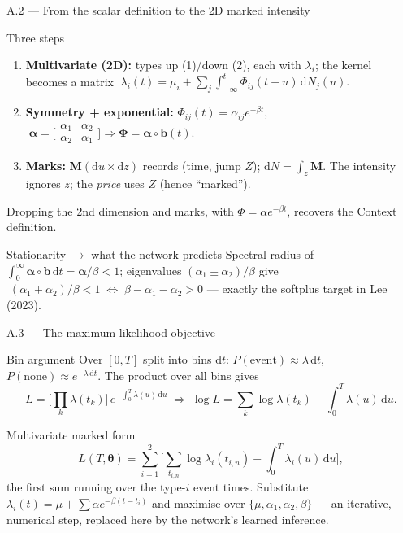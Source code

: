 \documentclass[aspectratio=169]{beamer}
\begin{document}
\begin{frame}{A.2 — From the scalar definition to the 2D marked intensity}
  \begin{block}{Three steps}
    \footnotesize
    \begin{enumerate}
      \item \textbf{Multivariate (2D):} types up (1)/down (2), each with $\lambda_i$; the kernel becomes a matrix
        $\;\lambda_i(t)=\mu_i+\sum_j\int_{-\infty}^t\Phi_{ij}(t-u)\,\mathrm{d}N_j(u).$
      \item \textbf{Symmetry + exponential:} $\Phi_{ij}(t)=\alpha_{ij}e^{-\beta t}$, $\;\boldsymbol\alpha=\big[\begin{smallmatrix}\alpha_1&\alpha_2\\ \alpha_2&\alpha_1\end{smallmatrix}\big]\Rightarrow \boldsymbol\Phi=\boldsymbol\alpha\circ\boldsymbol b(t)$.
      \item \textbf{Marks:} $\boldsymbol M(\mathrm{d}u\times\mathrm{d}z)$ records (time, jump $Z$); $\mathrm{d}N=\int_z\boldsymbol M$. The intensity ignores $z$; the \emph{price} uses $Z$ (hence ``marked'').
    \end{enumerate}
    Dropping the 2nd dimension and marks, with $\Phi=\alpha e^{-\beta t}$, recovers the Context definition.
  \end{block}
  \begin{alertblock}{Stationarity $\to$ what the network predicts}
    \footnotesize Spectral radius of $\int_0^\infty\boldsymbol\alpha\circ\boldsymbol b\,\mathrm{d}t=\boldsymbol\alpha/\beta<1$; eigenvalues $(\alpha_1\pm\alpha_2)/\beta$ give
    $\;(\alpha_1+\alpha_2)/\beta<1\;\Longleftrightarrow\;\beta-\alpha_1-\alpha_2>0$ — exactly the softplus target in Lee (2023).
  \end{alertblock}
\end{frame}

\begin{frame}{A.3 — The maximum-likelihood objective}
  \begin{block}{Bin argument}
    Over $[0,T]$ split into bins $\mathrm{d}t$: $P(\text{event})\approx\lambda\,\mathrm{d}t$, $P(\text{none})\approx e^{-\lambda\,\mathrm{d}t}$. The product over all bins gives
    \[
      L=\Big[\textstyle\prod_k\lambda(t_k)\Big]\,e^{-\int_0^T\lambda(u)\,\mathrm{d}u}
      \;\Rightarrow\;
      \log L=\sum_k\log\lambda(t_k)-\int_0^T\lambda(u)\,\mathrm{d}u.
    \]
  \end{block}
  \begin{block}{Multivariate marked form}
    \[
      L(T,\boldsymbol\theta)=\sum_{i=1}^{2}\Big[\sum_{t_{i,n}}\log\lambda_i(t_{i,n})-\int_0^T\!\lambda_i(u)\,\mathrm{d}u\Big],
    \]
    \footnotesize the first sum running over the type-$i$ event times. Substitute $\lambda_i(t)=\mu+\sum\alpha e^{-\beta(t-t_i)}$ and maximise over $\{\mu,\alpha_1,\alpha_2,\beta\}$ — an iterative, numerical step, replaced here by the network's learned inference.
  \end{block}
\end{frame}
\end{document}
